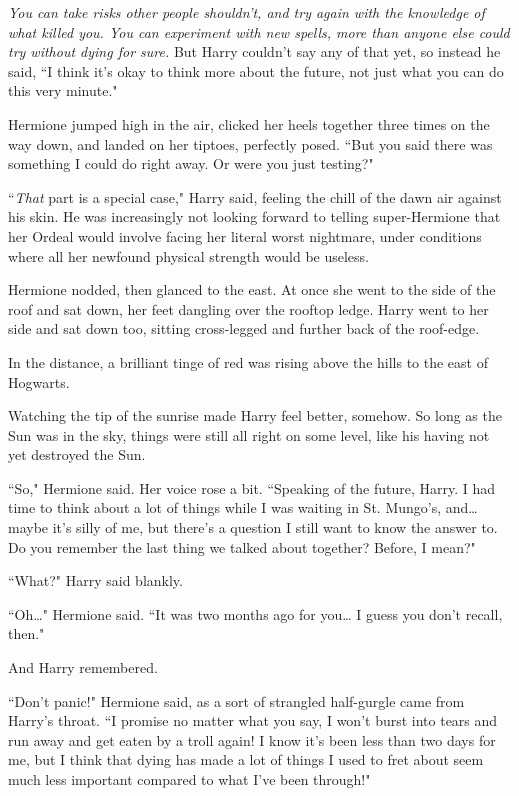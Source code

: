 \emph{You can take risks other people shouldn't, and try again with the knowledge of what killed you. You can experiment with new spells, more than anyone else could try without dying for sure.} But Harry couldn't say any of that yet, so instead he said, ``I think it's okay to think more about the future, not just what you can do this very minute."

Hermione jumped high in the air, clicked her heels together three times on the way down, and landed on her tiptoes, perfectly posed. ``But you said there was something I could do right away. Or were you just testing?"

``\emph{That} part is a special case," Harry said, feeling the chill of the dawn air against his skin. He was increasingly not looking forward to telling super-Hermione that her Ordeal would involve facing her literal worst nightmare, under conditions where all her newfound physical strength would be useless.

Hermione nodded, then glanced to the east. At once she went to the side of the roof and sat down, her feet dangling over the rooftop ledge. Harry went to her side and sat down too, sitting cross-legged and further back of the roof-edge.

In the distance, a brilliant tinge of red was rising above the hills to the east of Hogwarts.

Watching the tip of the sunrise made Harry feel better, somehow. So long as the Sun was in the sky, things were still all right on some level, like his having not yet destroyed the Sun.

``So," Hermione said. Her voice rose a bit. ``Speaking of the future, Harry. I had time to think about a lot of things while I was waiting in St. Mungo's, and{\ldots} maybe it's silly of me, but there's a question I still want to know the answer to. Do you remember the last thing we talked about together? Before, I mean?"

``What?" Harry said blankly.

``Oh{\ldots}" Hermione said. ``It was two months ago for you{\ldots} I guess you don't recall, then."

And Harry remembered.

``Don't panic!" Hermione said, as a sort of strangled half-gurgle came from Harry's throat. ``I promise no matter what you say, I won't burst into tears and run away and get eaten by a troll again! I know it's been less than two days for me, but I think that dying has made a lot of things I used to fret about seem much less important compared to what I've been through!"

